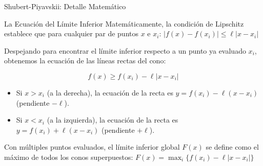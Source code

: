 \begin{frame}{Shubert-Piyavskii: Detalle Matemático}
    \begin{alertblock}{La Ecuación del Límite Inferior}
        \small
        Matemáticamente, la condición de Lipschitz establece que para cualquier par de puntos $x$ e $x_i$:
        $|f(x) - f(x_i)| \le \ell |x - x_i|$
    \end{alertblock}

    \footnotesize
    Despejando para encontrar el límite inferior respecto a un punto ya evaluado $x_i$, obtenemos 
    la ecuación de las líneas rectas del cono:
    
    \begin{equation*}
        f(x) \ge f(x_i) - \ell|x - x_i|
    \end{equation*}

    \scriptsize
    \begin{itemize}
        \item Si $x > x_i$ (a la derecha), la ecuación de la recta es $y = f(x_i) - \ell(x - x_i)$ (pendiente $-\ell$).
        \item Si $x < x_i$ (a la izquierda), la ecuación de la recta es $y = f(x_i) + \ell(x - x_i)$ (pendiente $+\ell$).
    \end{itemize}
    
    \vspace{0.5em}
    \footnotesize
    Con múltiples puntos evaluados, el límite inferior global $F(x)$ se define como el máximo de todos los conos superpuestos:
    $F(x) = \max_i \{ f(x_i) - \ell|x - x_i| \}$
\end{frame}

